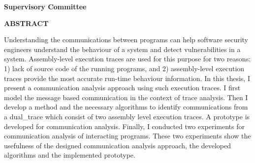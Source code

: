 \newpage
{}

\noindent \textbf{Supervisory Committee}
\tpbreak
\panel

\begin{center}
\textbf{ABSTRACT}
\end{center}

Understanding the communications between programs can help software security engineers understand the behaviour of a system and detect vulnerabilities in a system. Assembly-level execution traces are used for this purpose for two reasons: 1) lack of source code of the running programs, and 2) assembly-level execution traces provide the most accurate run-time behaviour information. In this thesis, I present a communication analysis approach using such execution traces. I first model the message based communication in the context of trace analysis. Then I develop a method and the necessary algorithms to identify communications from a dual\_trace which consist of two assembly level execution traces. A prototype is developed for communication analysis. Finally, I conducted two experiments for communication analysis of interacting programs. These two experiments show the usefulness of the designed communication analysis approach, the developed algorithms and the implemented prototype. 

